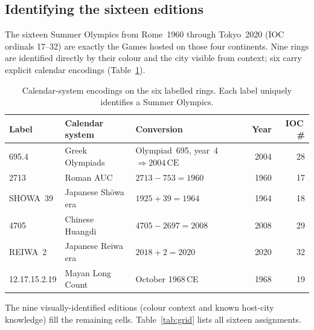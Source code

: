 \documentclass{article}
\begin{document}
\subsection{Identifying the sixteen editions}

The sixteen Summer Olympics from Rome~1960 through Tokyo~2020
(IOC ordinals 17--32) are exactly the Games hosted on those four
continents.  Nine rings are identified directly by their colour
and the city visible from context; six carry explicit calendar
encodings (Table~\ref{tab:cal}).

\begin{table}[h]
  \centering
  \caption{Calendar-system encodings on the six labelled rings.
    Each label uniquely identifies a Summer Olympics.}
  \label{tab:cal}
  \small
  \begin{tabular}{llp{4.2cm}rr}
    \toprule
    Label & Calendar system & Conversion & Year & IOC\,\# \\
    \midrule
    695.4  & Greek Olympiads &
      Olympiad~695, year~4\newline $\Rightarrow 2004\,\mathrm{CE}$
      & 2004 & 28 \\
    2713   & Roman AUC &
      $2713 - 753 = 1960$
      & 1960 & 17 \\
    SH\={O}WA~39 & Japanese Sh\={o}wa era &
      $1925 + 39 = 1964$
      & 1964 & 18 \\
    4705   & Chinese Huangdi &
      $4705 - 2697 = 2008$
      & 2008 & 29 \\
    REIWA~2 & Japanese Reiwa era &
      $2018 + 2 = 2020$
      & 2020 & 32 \\
    12.17.15.2.19 & Mayan Long Count &
      October 1968\,CE
      & 1968 & 19 \\
    \bottomrule
  \end{tabular}
\end{table}

The nine visually-identified editions (colour context and known
host-city knowledge) fill the remaining cells.
Table~\ref{tab:grid} lists all sixteen assignments.
\end{document}
